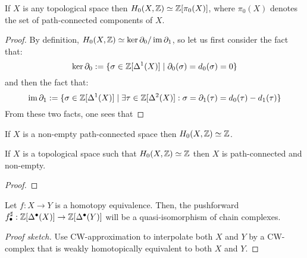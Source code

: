     	    \begin{proposition}[$0^{th}$ homology] \label{prop: 0th_homology}
                If $X$ is any topological space then $H_0(X, \mathbb{Z}) \simeq \mathbb{Z}[\pi_0(X)]$, where $\pi_0(X)$ denotes the set of path-connected components of $X$.
    	    \end{proposition}
    	        \begin{proof}
                    By definition, $H_0(X, \mathbb{Z}) \simeq \ker \partial_0/\operatorname{im} \partial_1$, so let us first consider the fact that:
                        $$\ker \partial_0 := \{\sigma \in \mathbb{Z}[\Delta^1(X)] \mid \partial_0(\sigma) = d_0(\sigma) = 0\}$$
                    and then the fact that:
                        $$\operatorname{im} \partial_1 := \{\sigma \in \mathbb{Z}[\Delta^1(X)] \mid \exists \tau \in \mathbb{Z}[\Delta^2(X)]: \sigma = \partial_1(\tau) = d_0(\tau) - d_1(\tau)\}$$
                    From these two facts, one sees that 
    	        \end{proof}
            \begin{corollary}
                If $X$ is a non-empty path-connected space then $H_0(X, \mathbb{Z}) \simeq \mathbb{Z}$. 
            \end{corollary}
            \begin{proposition} \label{prop: a_homological_criterion_for_path_connectedness}
                If $X$ is a topological space such that $H_0(X, \mathbb{Z}) \simeq \mathbb{Z}$ then $X$ is path-connected and non-empty. 
            \end{proposition}
                \begin{proof}
                    
                \end{proof}
                
            \begin{proposition} \label{prop: singular_homology_is_homotopy_invariant}
                Let $f: X \to Y$ is a homotopy equivalence. Then, the pushforward $f^{\sharp}_{\bullet}: \mathbb{Z}[\Delta^{\bullet}(X)] \to \mathbb{Z}[\Delta^{\bullet}(Y)]$ will be a quasi-isomorphism of chain complexes. 
    	    \end{proposition}
    	        \begin{proof}[Proof sketch]
    	            Use CW-approximation to interpolate both $X$ and $Y$ by a CW-complex that is weakly homotopically equivalent to both $X$ and $Y$. 
    	        \end{proof}
                
